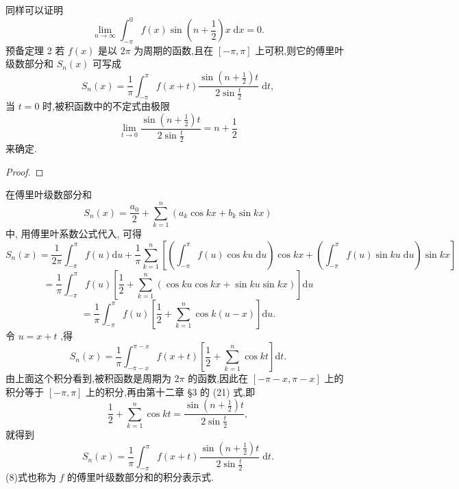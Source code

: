 同样可以证明
\[
\mathop{\lim }\limits_{{n \rightarrow  \infty }}{\int }_{-\pi }^{0}f\left( x\right) \sin \left( {n + \frac{1}{2}}\right) x\mathrm{\;d}x = 0. \tag{0}
\]
预备定理 2 若 \(f\left( x\right)\) 是以 \({2\pi }\) 为周期的函数,且在 \(\left\lbrack  {-\pi ,\pi }\right\rbrack\) 上可积,则它的傅里叶级数部分和 \({S}_{n}\left( x\right)\) 可写成
\[
{S}_{n}\left( x\right)  = \frac{1}{\pi }{\int }_{-\pi }^{\pi }f\left( {x + t}\right) \frac{\sin \left( {n + \frac{1}{2}}\right) t}{2\sin \frac{t}{2}}\mathrm{\;d}t, \tag{8}
\]
当 \(t = 0\) 时,被积函数中的不定式由极限
\[
\mathop{\lim }\limits_{{t \rightarrow  0}}\frac{\sin \left( {n + \frac{1}{2}}\right) t}{2\sin \frac{t}{2}} = n + \frac{1}{2}
\]
来确定.

\begin{proof}

\end{proof}
在傅里叶级数部分和
\[
{S}_{n}\left( x\right)  = \frac{{a}_{0}}{2} + \mathop{\sum }\limits_{{k = 1}}^{n}\left( {{a}_{k}\cos {kx} + {b}_{k}\sin {kx}}\right)
\]
中, 用傅里叶系数公式代入, 可得
\[
{S}_{n}\left( x\right)  = \frac{1}{2\pi }{\int }_{-\pi }^{\pi }f\left( u\right) \mathrm{d}u + \frac{1}{\pi }\mathop{\sum }\limits_{{k = 1}}^{n}\left\lbrack  {\left( {{\int }_{-\pi }^{\pi }f\left( u\right) \cos {ku}\mathrm{\;d}u}\right) \cos {kx} + \left( {{\int }_{-\pi }^{\pi }f\left( u\right) \sin {ku}\mathrm{\;d}u}\right) \sin {kx}}\right\rbrack
\]
\[
= \frac{1}{\pi }{\int }_{-\pi }^{\pi }f\left( u\right) \left\lbrack  {\frac{1}{2} + \mathop{\sum }\limits_{{k = 1}}^{n}\left( {\cos {ku}\cos {kx} + \sin {ku}\sin {kx}}\right) }\right\rbrack  \mathrm{d}u
\]
\[
= \frac{1}{\pi }{\int }_{-\pi }^{\pi }f\left( u\right) \left\lbrack  {\frac{1}{2} + \mathop{\sum }\limits_{{k = 1}}^{n}\cos k\left( {u - x}\right) }\right\rbrack  \mathrm{d}u.
\]
令 \(u = x + t\) ,得
\[
{S}_{n}\left( x\right)  = \frac{1}{\pi }{\int }_{-\pi  - x}^{\pi  - x}f\left( {x + t}\right) \left\lbrack  {\frac{1}{2} + \mathop{\sum }\limits_{{k = 1}}^{n}\cos {kt}}\right\rbrack  \mathrm{d}t.
\]
由上面这个积分看到,被积函数是周期为 \({2\pi }\) 的函数,因此在 \(\left\lbrack  {-\pi  - x,\pi  - x}\right\rbrack\) 上的积分等于 \(\left\lbrack  {-\pi ,\pi }\right\rbrack\) 上的积分,再由第十二章 §3 的 (21) 式,即
\[
\frac{1}{2} + \mathop{\sum }\limits_{{k = 1}}^{n}\cos {kt} = \frac{\sin \left( {n + \frac{1}{2}}\right) t}{2\sin \frac{t}{2}}, \tag{9}
\]
就得到
\[
{S}_{n}\left( x\right)  = \frac{1}{\pi }{\int }_{-\pi }^{\pi }f\left( {x + t}\right) \frac{\sin \left( {n + \frac{1}{2}}\right) t}{2\sin \frac{t}{2}}\mathrm{\;d}t.
\]
(8)式也称为 \(f\) 的傅里叶级数部分和的积分表示式.

